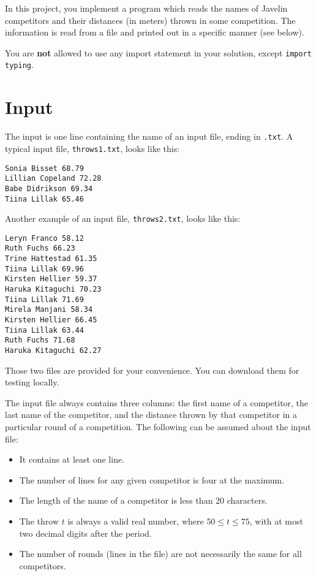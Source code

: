 
In this project, you implement a program which reads the names of Javelin competitors and their distances (in meters) thrown in some competition.
The information is read from a file and printed out in a specific manner (see below).

\noindent
You are \textbf{not} allowed to use any import statement in your solution, except \texttt{import typing}. \\

\section*{Input}
The input is one line containing the name of an input file, ending in \texttt{.txt}.
A typical input file, \texttt{throws1.txt}, looks like this:
\begin{verbatim}
Sonia Bisset 68.79
Lillian Copeland 72.28
Babe Didrikson 69.34
Tiina Lillak 65.46
\end{verbatim}

Another example of an input file, \texttt{throws2.txt}, looks like this:
\begin{verbatim}
Leryn Franco 58.12
Ruth Fuchs 66.23
Trine Hattestad 61.35
Tiina Lillak 69.96
Kirsten Hellier 59.37
Haruka Kitaguchi 70.23
Tiina Lillak 71.69
Mirela Manjani 58.34
Kirsten Hellier 66.45
Tiina Lillak 63.44
Ruth Fuchs 71.68
Haruka Kitaguchi 62.27
\end{verbatim}

Those two files are provided for your convenience.
You can download them for testing locally.

The input file always contains three columns: the first name of a competitor, the last name of the competitor, and the distance thrown by that competitor in a particular round of a competition.  
The following can be assumed about the input file:
\begin{itemize} 
\item It contains at least one line.
\item The number of lines for any given competitor is four at the maximum.
\item The length of the name of a competitor is less than $20$ characters.
\item The throw $t$ is always a valid real number, where $50 \le t \le 75$, with at most two decimal digits after the period.
\item The number of rounds (lines in the file) are not necessarily the same for all competitors.  
\end{itemize}

